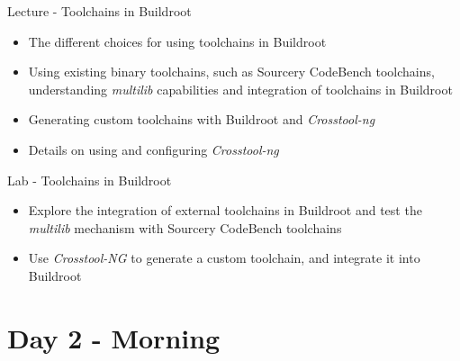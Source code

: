 \documentclass[a4paper,12pt,obeyspaces,spaces,hyphens]{article}
\begin{document}
\feagendatwocolumn
{Lecture - Toolchains in Buildroot}
{
  \begin{itemize}
  \item The different choices for using toolchains in Buildroot
  \item Using existing binary toolchains, such as Sourcery CodeBench
    toolchains, understanding {\em multilib} capabilities and
    integration of toolchains in Buildroot
  \item Generating custom toolchains with Buildroot and {\em Crosstool-ng}
  \item Details on using and configuring {\em Crosstool-ng}
  \end{itemize}
}
{Lab - Toolchains in Buildroot}
{
  \begin{itemize}
  \item Explore the integration of external toolchains in Buildroot
    and test the {\em multilib} mechanism with Sourcery CodeBench
    toolchains
  \item Use {\em Crosstool-NG} to generate a custom toolchain, and
    integrate it into Buildroot
  \end{itemize}
}

\section{Day 2 - Morning}
\end{document}
